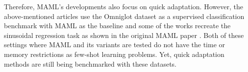 

Therefore, MAML's developments also focus on quick adaptation. However, the above-mentioned articles use the Omniglot dataset \cite{lake2019} as a supervised classification benchmark with MAML as the baseline and some of the works recreate the sinusoidal regression task as shown in the original MAML paper \cite{finn2017}. Both of these settings where MAML and its variants are tested do not have the time or memory restrictions as few-shot learning problems. Yet, quick adaptation methods are still being benchmarked with these datasets. %
